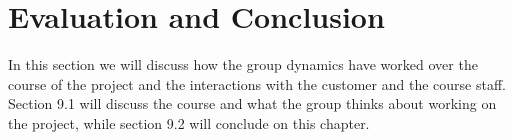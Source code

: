 \chapter{Evaluation and Conclusion}

In this section we will discuss how the group dynamics have worked over the course of the project and the interactions with the customer and the course staff. Section 9.1 will discuss the course and what the group thinks about working on the project, while section 9.2 will conclude on this chapter.